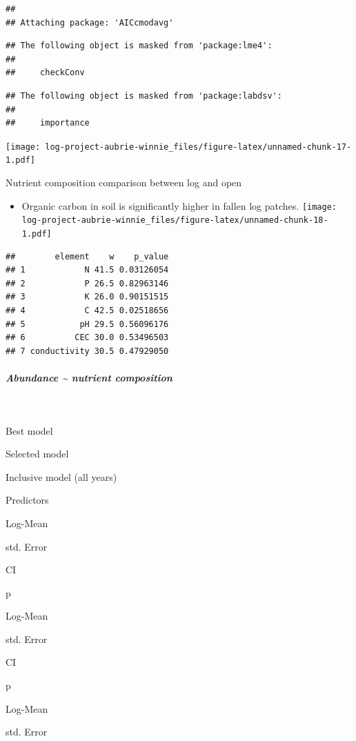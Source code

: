 \documentclass[
]{article}
\providecommand{\tightlist}{%
  \setlength{\itemsep}{0pt}\setlength{\parskip}{0pt}}
\begin{document}
\begin{verbatim}
## 
## Attaching package: 'AICcmodavg'
\end{verbatim}

\begin{verbatim}
## The following object is masked from 'package:lme4':
## 
##     checkConv
\end{verbatim}

\begin{verbatim}
## The following object is masked from 'package:labdsv':
## 
##     importance
\end{verbatim}

\texttt{[image: log-project-aubrie-winnie\_files/figure-latex/unnamed-chunk-17-1.pdf]}

Nutrient composition comparison between log and open

\begin{itemize}
\tightlist
\item
  Organic carbon in soil is significantly higher in fallen log patches.
  \texttt{[image: log-project-aubrie-winnie\_files/figure-latex/unnamed-chunk-18-1.pdf]}
\end{itemize}

\begin{verbatim}
##        element    w    p_value
## 1            N 41.5 0.03126054
## 2            P 26.5 0.82963146
## 3            K 26.0 0.90151515
## 4            C 42.5 0.02518656
## 5           pH 29.5 0.56096176
## 6          CEC 30.0 0.53496503
## 7 conductivity 30.5 0.47929050
\end{verbatim}

\hypertarget{abundance-nutrient-composition}{%
\subparagraph{Abundance \textasciitilde{} nutrient
composition}\label{abundance-nutrient-composition}}

~

Best model

Selected model

Inclusive model (all years)

Predictors

Log-Mean

std. Error

CI

p

Log-Mean

std. Error

CI

p

Log-Mean

std. Error
\end{document}
